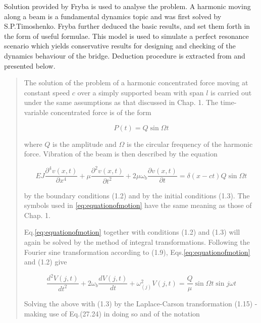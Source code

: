 Solution provided by Fryba\cite{fryba1999vibration} is used to analyse the problem. A harmonic moving along a beam is a fundamental dynamics topic and was first solved by S.P.Timoshenko. Fryba further deduced the basic results, and set them forth in the form of useful formulae. This model is used to simulate a perfect resonance scenario which yields conservative results for designing and checking of the dynamics behaviour of the bridge. Deduction procedure is extracted from \cite[Section II.2.1]{fryba1999vibration} and presented below.

\begin{quote}

The solution of the problem of a harmonic concentrated force moving at constant speed $c$ over a simply supported beam with span $l$ is carried out under the same assumptions as that discussed in Chap. 1. The time-variable concentrated force is of the form

\begin{equation}
    P(t) = Q \sin \Omega t
\end{equation}

where $Q$ is the amplitude and $\Omega$ is the circular frequency of the harmonic force. Vibration of the beam is then described by the equation

\begin{equation}\label{eq:equationofmotion}
    EJ\frac{\partial^4 v(x,t)}{\partial x^4} + \mu\frac{\partial^2 v(x,t)}{\partial t^2} +2\mu\omega_b \frac{\partial v(x,t)}{\partial t} = \delta(x-ct)Q\sin\Omega t 
\end{equation}

by the boundary conditions (1.2) and by the initial conditions (1.3). The symbols used in \ref{eq:equationofmotion} have the same meaning as those of Chap. 1.

Eq.\ref{eq:equationofmotion} together with conditions (1.2) and (1.3) will again be solved by the method of integral transformations. Following the Fourier sine transformation according to (1.9), Eqs.\ref{eq:equationofmotion} and (1.2) give

\begin{equation}
    \frac{d^2 V(j,t)}{d t^2} + 2\omega_b\frac{dV(j,t)}{dt} + \omega_{(j)}^2 V(j,t) = \frac{Q}{\mu} \sin\Omega t \sin j\omega t
\end{equation}

Solving the above with (1.3) by the Laplace-Carson transformation (1.15) - making use of Eq.(27.24) in doing so and of the notation


\end{quote}
